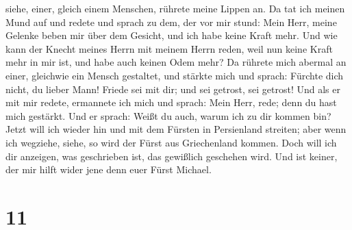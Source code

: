 siehe, einer, gleich einem Menschen, rührete meine Lippen an. Da tat ich
meinen Mund auf und redete und sprach zu dem, der vor mir stund: Mein
Herr, meine Gelenke beben mir über dem Gesicht, und ich habe keine Kraft
mehr.  Und wie kann der Knecht meines Herrn mit meinem
Herrn reden, weil nun keine Kraft mehr in mir ist, und habe auch keinen
Odem mehr?  Da rührete mich abermal an einer, gleichwie ein
Mensch gestaltet, und stärkte mich  und sprach: Fürchte
dich nicht, du lieber Mann! Friede sei mit dir; und sei getrost, sei
getrost! Und als er mit mir redete, ermannete ich mich und sprach: Mein
Herr, rede; denn du hast mich gestärkt.  Und er sprach:
Weißt du auch, warum ich zu dir kommen bin? Jetzt will ich wieder hin
und mit dem Fürsten in Persienland streiten; aber wenn ich wegziehe,
siehe, so wird der Fürst aus Griechenland kommen.  Doch
will ich dir anzeigen, was geschrieben ist, das gewißlich geschehen
wird. Und ist keiner, der mir hilft wider jene denn euer Fürst Michael.

\hypertarget{section-10}{%
\section{11}\label{section-10}}

